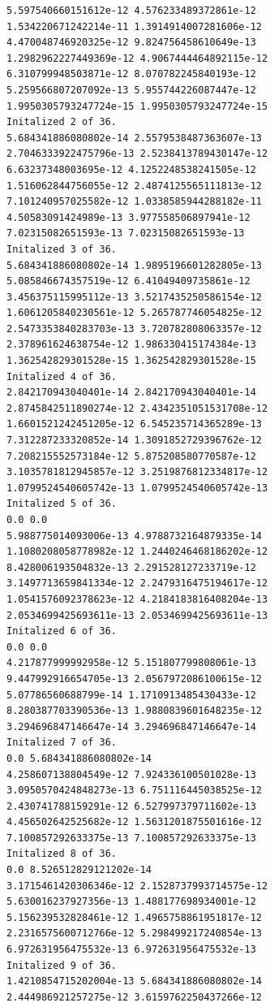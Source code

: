 \documentclass[11pt]{article}
\begin{document}
    \begin{Verbatim}[commandchars=\\\{\}]
5.597540660151612e-12 4.576233489372861e-12
1.534220671242214e-11 1.3914914007281606e-12
4.470048746920325e-12 9.824756458610649e-13
1.2982962227449369e-12 4.9067444464892115e-12
6.310799948503871e-12 8.070782245840193e-12
5.259566807207092e-13 5.955744226087447e-12
1.9950305793247724e-15 1.9950305793247724e-15
Initalized 2 of 36.
5.684341886080802e-14 2.5579538487363607e-13
2.7046333922475796e-13 2.5238413789430147e-12
6.63237348003695e-12 4.1252248538241505e-12
1.516062844756055e-12 2.4874125565111813e-12
7.101240957025582e-12 1.0338585944288182e-11
4.50583091424989e-13 3.977558506897941e-12
7.02315082651593e-13 7.02315082651593e-13
Initalized 3 of 36.
5.684341886080802e-14 1.9895196601282805e-13
5.085846674357519e-12 6.41049409735861e-12
3.456375115995112e-13 3.5217435250586154e-12
1.6061205840230561e-12 5.265787746054825e-12
2.5473353840283703e-13 3.720782808063357e-12
2.378961624638754e-12 1.986330415174384e-13
1.362542829301528e-15 1.362542829301528e-15
Initalized 4 of 36.
2.842170943040401e-14 2.842170943040401e-14
2.8745842511890274e-12 2.4342351051531708e-12
1.6601521242451205e-12 6.545235714365289e-13
7.312287233320852e-14 1.3091852729396762e-12
7.208215552573184e-12 5.875208580770587e-12
3.1035781812945857e-12 3.2519876812334817e-12
1.0799524540605742e-13 1.0799524540605742e-13
Initalized 5 of 36.
0.0 0.0
5.988775014093006e-13 4.9788732164879335e-14
1.1080208058778982e-12 1.2440246468186202e-12
8.428006193504832e-13 2.291528127233719e-12
3.1497713659841334e-12 2.2479316475194617e-12
1.0541576092378623e-12 4.2184183816408204e-13
2.0534699425693611e-13 2.0534699425693611e-13
Initalized 6 of 36.
0.0 0.0
4.217877999992958e-12 5.151807799808061e-13
9.447992916654705e-13 2.0567972086100615e-12
5.07786560688799e-14 1.1710913485430433e-12
8.280387703390536e-13 1.9880839601648235e-12
3.294696847146647e-14 3.294696847146647e-14
Initalized 7 of 36.
0.0 5.684341886080802e-14
4.258607138804549e-12 7.924336100501028e-13
3.0950570424848273e-13 6.751116445038525e-12
2.430741788159291e-12 6.527997379711602e-13
4.456502642525682e-12 1.5631201875501616e-12
7.100857292633375e-13 7.100857292633375e-13
Initalized 8 of 36.
0.0 8.526512829121202e-14
3.1715461420306346e-12 2.1528737993714575e-12
5.630016237927356e-13 1.488177698934001e-12
5.156239532828461e-12 1.4965758861951817e-12
2.2316575600712766e-12 5.298499217240854e-13
6.972631956475532e-13 6.972631956475532e-13
Initalized 9 of 36.
1.4210854715202004e-13 5.684341886080802e-14
2.444986921257275e-12 3.6159762250437266e-12

\end{Verbatim}
\end{document}
